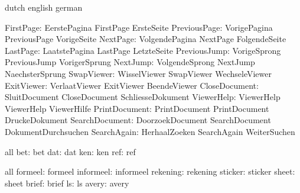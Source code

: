 \startvariables      dutch             english              german
 
         FirstPage:  EerstePagina      FirstPage            ErsteSeite
      PreviousPage:  VorigePagina      PreviousPage         VorigeSeite
          NextPage:  VolgendePagina    NextPage             FolgendeSeite
          LastPage:  LaatstePagina     LastPage             LetzteSeite
      PreviousJump:  VorigeSprong      PreviousJump         VorigerSprung
          NextJump:  VolgendeSprong    NextJump             NaechsterSprung
        SwapViewer:  WisselViewer      SwapViewer           WechseleViewer
        ExitViewer:  VerlaatViewer     ExitViewer           BeendeViewer
     CloseDocument:  SluitDocument     CloseDocument        SchliesseDokument
        ViewerHelp:  ViewerHelp        ViewerHelp           ViewerHilfe
     PrintDocument:  PrintDocument     PrintDocument        DruckeDokument
    SearchDocument:  DoorzoekDocument  SearchDocument       DokumentDurchsuchen
       SearchAgain:  HerhaalZoeken     SearchAgain          WeiterSuchen

\stopvariables




\startconstants       all
                bet:  bet
                dat:  dat
                ken:  ken
                ref:  ref
\stopconstants

\startvariables       all
            formeel:  formeel
          informeel:  informeel
           rekening:  rekening
            sticker:  sticker
              sheet:  sheet
              brief:  brief       
                 ls:  ls
              avery:  avery
\stopvariables


\endinput

